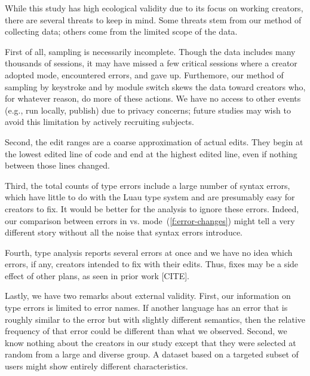 \documentclass[english,submission,cleveref]{programming}
\begin{document}
While this study has high ecological validity due to its focus on
working creators, there are several threats to keep in mind.
Some threats stem from our method of collecting data; others
come from the limited scope of the data.

First of all, sampling is necessarily incomplete.
Though the data includes many thousands of sessions, it
may have missed a few critical sessions where a creator
adopted \mstrict{} mode, encountered  errors,
and gave up.
Furthemore, our method of sampling by keystroke and by module switch
skews the data toward creators who, for whatever reason, do more
of these actions.
We have no access to other events (e.g., run locally, publish) due to privacy
concerns; future studies may wish to avoid this limitation by actively
recruiting subjects.

Second, the edit ranges are a coarse approximation of actual edits.
They begin at the lowest edited line of code and end at the highest
edited line, even if nothing between those lines changed.

Third, the total counts of type errors include a large number of syntax errors,
which have little to do with the Luau type system and are presumably easy for
creators to fix.
It would be better for the analysis to ignore these errors.
Indeed, our comparison between \FS{} errors in \mnocheck{} vs.
\mstrict{} mode~(\cref{f:error-changes}) might tell a very different story
without all the noise that syntax errors introduce.

Fourth, type analysis reports several errors at once and we have no idea which
errors, if any, creators intended to fix with their edits.
Thus, fixes may be a side effect of other plans, as seen in prior work [CITE].


Lastly, we have two remarks about external validity.
First, our information on type errors is limited to error names.
If another language has an error that is roughly similar to
the
 error but with slightly different
semantics, then the relative frequency of that error could be different
than what we observed.
Second, we know nothing about the creators in our study except that they
were selected at random from a large and diverse group.
A dataset based on a targeted subset of users might show entirely different
characteristics.
\end{document}
